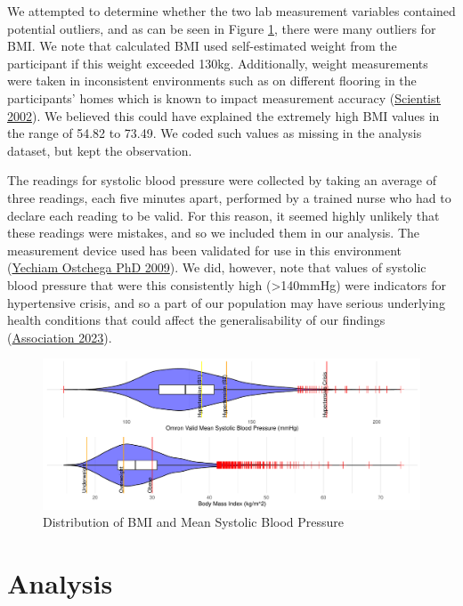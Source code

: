 \documentclass[
  11pt,
  twocolumn]{article}
\begin{document}
We attempted to determine whether the two lab measurement variables
contained potential outliers, and as can be seen in Figure
\ref{fig:output-distribution-plots}, there were many outliers for BMI.
We note that calculated BMI used self-estimated weight from the
participant if this weight exceeded 130kg. Additionally, weight
measurements were taken in inconsistent environments such as on
different flooring in the participants' homes which is known to impact
measurement accuracy (\protect\hyperlink{ref-Weight}{Scientist 2002}).
We believed this could have explained the extremely high BMI values in
the range of 54.82 to 73.49. We coded such values as missing in the
analysis dataset, but kept the observation.

The readings for systolic blood pressure were collected by taking an
average of three readings, each five minutes apart, performed by a
trained nurse who had to declare each reading to be valid. For this
reason, it seemed highly unlikely that these readings were mistakes, and
so we included them in our analysis. The measurement device used has
been validated for use in this environment
(\protect\hyperlink{ref-Omron}{Yechiam Ostchega PhD 2009}). We did,
however, note that values of systolic blood pressure that were this
consistently high (\textgreater140mmHg) were indicators for hypertensive
crisis, and so a part of our population may have serious underlying
health conditions that could affect the generalisability of our findings
(\protect\hyperlink{ref-heart}{Association 2023}).

\begin{figure}[H]
\includegraphics{Coursework_files/figure-latex/output-distribution-plots-1} \caption{Distribution of BMI and Mean Systolic Blood Pressure}\label{fig:output-distribution-plots}
\end{figure}

\hypertarget{analysis}{%
\section{Analysis}\label{analysis}}
\end{document}

